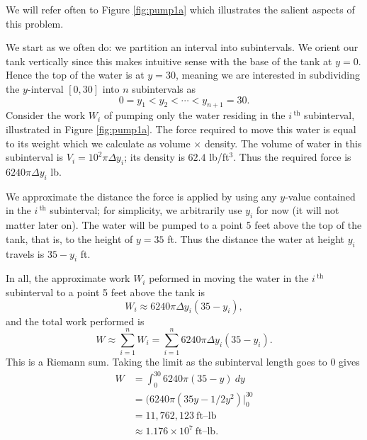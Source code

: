 {We will refer often to Figure \ref{fig:pump1a} which illustrates the salient aspects of this problem.

We start as we often do: we partition an interval into subintervals. We orient our tank vertically since this makes intuitive sense with the base of the tank at $y=0$. Hence the top of the water is at $y=30$, meaning we are interested in subdividing the $y$-interval $[0,30]$ into $n$ subintervals as 
$$0 = y_1 < y_2 < \cdots < y_{n+1} = 30.$$
Consider the work $W_i$ of pumping only the water residing in the $i\,^\text{th}$ subinterval, illustrated in Figure \ref{fig:pump1a}. The force required to move this water is equal to its weight which we calculate as volume $\times $ density. The volume of water in this subinterval is 
$V_i = 10^2\pi \Delta y_i$; its density is $62.4$ lb/ft$^3$. Thus the required force is $6240\pi\Delta y_i$ lb.

We approximate the distance the force is applied by using any $y$-value contained in the $i\,^\text{th}$ subinterval; for simplicity, we arbitrarily use $y_i$ for now (it will not matter later on). The water will be pumped to a point 5 feet above the top of the tank, that is, to the height of $y=35$ ft. Thus the distance the water at height $y_i$ travels is $35-y_i$ ft. 

In all, the approximate work $W_i$ peformed in moving the water in the $i\,^\text{th}$ subinterval to a point 5 feet above the tank is 
$$W_i \approx 6240\pi\Delta y_i(35-y_i),$$
and the total work performed is
$$W \approx \sum_{i=1}^n W_i = \sum_{i=1}^n 6240\pi\Delta y_i(35-y_i).$$
This is a Riemann sum. Taking the limit as the subinterval length goes to 0 gives 
\begin{align*}
W 	&=	\int_0^{30} 6240\pi(35-y)\ dy \\
		&=  (6240\pi\left(35y-1/2y^2\right)\Big|_0^{30} \\
		&= 	11,762,123 \ \text{ft--lb}\\
		&\approx  1.176 \times 10^7 \ \text{ft--lb}.
\end{align*}
\baselineskip
}\\
\clearpage

